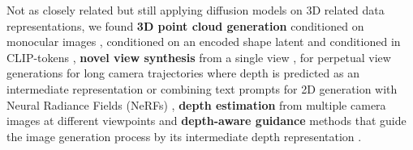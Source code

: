 Not as closely related but still applying diffusion models on 3D related data representations, we found \textbf{3D point cloud generation} conditioned on monocular images \citep{zhou_3d_2021}, conditioned on an encoded shape latent \citep{luo_diffusion_2021} and conditioned in CLIP-tokens \citep{nichol_point-e_2022}, \textbf{novel view synthesis} from a single view \citep{rockwell_pixelsynth_2021,watson_novel_2022}, for perpetual view generations for long camera trajectories where depth is predicted as an intermediate representation \citep{liu_infinite_2021} or combining text prompts for 2D generation with Neural Radiance Fields (NeRFs) \citep{poole_dreamfusion_2022}, \textbf{depth estimation} from multiple camera images at different viewpoints \citep{khan_differentiable_2021} and \textbf{depth-aware guidance} methods that guide the image generation process by its intermediate depth representation \citep{kim_dag_2023}.